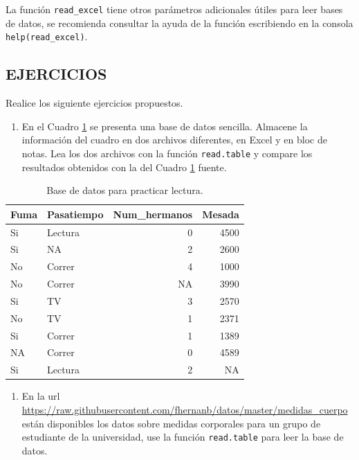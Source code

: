 \documentclass[10pt,]{krantz}
\providecommand{\tightlist}{%
  \setlength{\itemsep}{0pt}\setlength{\parskip}{0pt}}
\begin{document}
La función \texttt{read\_excel} tiene otros parámetros adicionales
útiles para leer bases de datos, se recomienda consultar la ayuda de la
función escribiendo en la consola \texttt{help(read\_excel)}.

\subsection*{EJERCICIOS}\label{ejercicios-2}

Realice los siguiente ejercicios propuestos.

\begin{enumerate}
\def\labelenumi{\arabic{enumi}.}
\tightlist
\item
  En el Cuadro \ref{tab:toy} se presenta una base de datos sencilla.
  Almacene la información del cuadro en dos archivos diferentes, en
  Excel y en bloc de notas. Lea los dos archivos con la función
  \texttt{read.table} y compare los resultados obtenidos con la del
  Cuadro \ref{tab:toy} fuente.
\end{enumerate}

\begin{table}[t]

\caption{\label{tab:toy}Base de datos para practicar lectura.}
\centering
\begin{tabular}{llrr}
\toprule
Fuma & Pasatiempo & Num\_hermanos & Mesada\\
\midrule
Si & Lectura & 0 & 4500\\
Si & NA & 2 & 2600\\
No & Correr & 4 & 1000\\
No & Correr & NA & 3990\\
Si & TV & 3 & 2570\\
\addlinespace
No & TV & 1 & 2371\\
Si & Correr & 1 & 1389\\
NA & Correr & 0 & 4589\\
Si & Lectura & 2 & NA\\
\bottomrule
\end{tabular}
\end{table}

\begin{enumerate}
\def\labelenumi{\arabic{enumi}.}
\setcounter{enumi}{1}
\tightlist
\item
  En la url
  \url{https://raw.githubusercontent.com/fhernanb/datos/master/medidas_cuerpo}
  están disponibles los datos sobre medidas corporales para un grupo de
  estudiante de la universidad, use la función \texttt{read.table} para
  leer la base de datos.
\end{enumerate}
\end{document}
